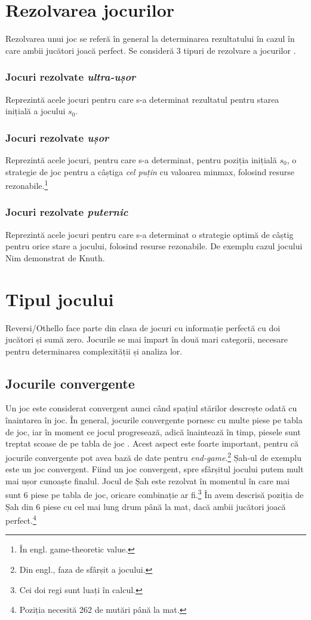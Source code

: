\documentclass[12pt,twoside,a4paper,fleqn]{book}
\theoremstyle{definition}
\begin{document}
\section{Rezolvarea jocurilor}
Rezolvarea unui joc se referă în general la determinarea rezultatului în cazul în care ambii jucători joacă perfect.
Se consideră 3 tipuri de rezolvare a jocurilor \cite{allis, games_solved_herik}. 
\subsubsection{Jocuri rezolvate \emph{ultra-ușor}}
Reprezintă acele jocuri pentru care s-a determinat rezultatul pentru starea inițială a jocului $s_{0}$.
\subsubsection{Jocuri rezolvate \emph{ușor}}
Reprezintă acele jocuri, pentru care s-a determinat, pentru poziția inițială $s_{0}$, o strategie de joc pentru a câștiga \emph{cel puțin} cu valoarea minmax, folosind resurse rezonabile.\footnote{În engl. game-theoretic value.}
\subsubsection{Jocuri rezolvate \emph{puternic}}
Reprezintă acele jocuri pentru care s-a determinat o strategie optimă de câștig pentru orice stare a jocului, folosind resurse rezonabile. De exemplu cazul jocului Nim demonstrat de Knuth.

\section{Tipul jocului}
Reversi/Othello face parte din clasa de jocuri cu informație perfectă cu doi jucători și sumă zero. Jocurile se mai împart în două mari categorii, necesare pentru determinarea complexității și analiza lor.
\subsection{Jocurile convergente}
Un joc este considerat convergent aunci când spațiul stărilor descrește odată cu înaintarea în joc. În general, jocurile convergente pornesc cu multe piese pe tabla de joc, iar în moment ce jocul progresează, adică înaintează în timp, piesele sunt treptat scoase de pe tabla de joc \cite{games_solved_herik}. Acest aspect este foarte important, pentru că jocurile convergente pot avea bază de date pentru \emph{end-game}.\footnote{Din engl., faza de sfârșit a jocului.} Șah-ul de exemplu este un joc convergent. Fiind un joc convergent, spre sfârșitul jocului putem mult mai ușor cunoaște finalul. Jocul de Șah este rezolvat în momentul în care mai sunt 6 piese pe tabla de joc, oricare combinație ar fi.\footnote{Cei doi regi sunt luați în calcul.} În \cite{games_solved_herik} avem descrisă poziția de Șah din 6 piese cu cel mai lung drum până la mat, dacă ambii jucători joacă perfect.\footnote{Poziția necesită 262 de mutări până la mat.}
\end{document}
